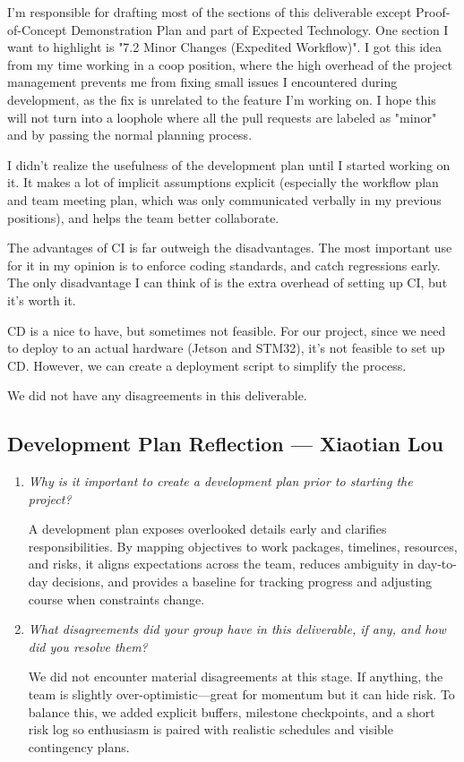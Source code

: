\documentclass{article}
\begin{document}
I'm responsible for drafting most of the sections of this deliverable except
Proof-of-Concept Demonstration Plan and part of Expected Technology. One
section I want to highlight is "7.2 Minor Changes (Expedited Workflow)". I got
this idea from my time working in a coop position, where the high overhead of
the project management prevents me from fixing small issues I encountered
during development, as the fix is unrelated to the feature I'm working on. I
hope this will not turn into a loophole where all the pull requests are labeled
as "minor" and by passing the normal planning process.

I didn't realize the usefulness of the development plan until I started working
on it. It makes a lot of implicit assumptions explicit (especially the workflow
plan and team meeting plan, which was only communicated verbally in my previous
positions), and helps the team better collaborate.

The advantages of CI is far outweigh the disadvantages. The most important use
for it in my opinion is to enforce coding standards, and catch regressions
early. The only disadvantage I can think of is the extra overhead of setting up
CI, but it's worth it.

CD is a nice to have, but sometimes not feasible. For our project, since we
need to deploy to an actual hardware (Jetson and STM32), it's not feasible to
set up CD. However, we can create a deployment script to simplify the process.

We did not have any disagreements in this deliverable.

\subsection*{Development Plan Reflection --- Xiaotian Lou}
\begin{enumerate}
  \item \textit{Why is it important to create a development plan prior to starting the project?}

  A development plan exposes overlooked details early and clarifies
  responsibilities. By mapping objectives to work packages, timelines,
  resources, and risks, it aligns expectations across the team, reduces
  ambiguity in day-to-day decisions, and provides a baseline for tracking
  progress and adjusting course when constraints change.

  \item \textit{What disagreements did your group have in this deliverable, if any, and how did you resolve them?}

  We did not encounter material disagreements at this stage. If anything,
  the team is slightly over-optimistic—great for momentum but it can hide
  risk. To balance this, we added explicit buffers, milestone checkpoints,
  and a short risk log so enthusiasm is paired with realistic schedules and
  visible contingency plans.
\end{enumerate}
\end{document}
